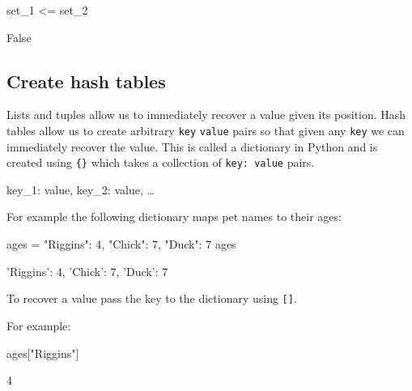 \begin{pyin}
set_1 <= set_2
\end{pyin}





\begin{raw}
False
\end{raw}





\subsection{Create hash tables}
\label{sec:create_hash_tables}

Lists and tuples allow us to immediately recover a value given its position.
Hash tables allow us to create arbitrary \texttt{key} \texttt{value} pairs so that given any
\texttt{key} we can immediately recover the value. This is called a dictionary in
Python and is created using \texttt{\{\}} which takes a collection of \texttt{key: value}
pairs.


\begin{pyin}
{key_1: value, key_2: value, …}
\end{pyin}



For example the following dictionary maps pet names to their ages:




\begin{pyin}
ages = {"Riggins": 4, "Chick": 7, "Duck": 7}
ages
\end{pyin}





\begin{raw}
{'Riggins': 4, 'Chick': 7, 'Duck': 7}
\end{raw}





To recover a value pass the key to the dictionary using \texttt{{[}{]}}.


For example:




\begin{pyin}
ages["Riggins"]
\end{pyin}





\begin{raw}
4
\end{raw}





